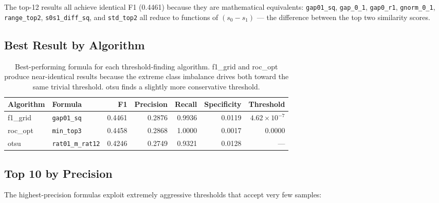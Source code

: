 \documentclass[11pt,a4paper]{article}
\newcommand{\formula}[1]{\texttt{#1}}
\newcommand{\algo}[1]{\textsf{#1}}
\begin{document}
\noindent The top-12 results all achieve identical F1 (0.4461) because they are mathematical equivalents: \formula{gap01\_sq}, \formula{gap\_0\_1}, \formula{gap0\_r1}, \formula{gnorm\_0\_1}, \formula{range\_top2}, \formula{s0s1\_diff\_sq}, and \formula{std\_top2} all reduce to functions of $(s_0 - s_1)$ --- the difference between the top two similarity scores.

\subsection{Best Result by Algorithm}

\begin{table}[htbp]
\centering
\caption{Best-performing formula for each threshold-finding algorithm. \algo{f1\_grid} and \algo{roc\_opt} produce near-identical results because the extreme class imbalance drives both toward the same trivial threshold. \algo{otsu} finds a slightly more conservative threshold.}
\label{tab:best_by_algo}
\begin{tabular}{@{}llrrrrr@{}}
\toprule
\textbf{Algorithm} & \textbf{Formula} & \textbf{F1} & \textbf{Precision} & \textbf{Recall} & \textbf{Specificity} & \textbf{Threshold} \\
\midrule
f1\_grid & \formula{gap01\_sq} & 0.4461 & 0.2876 & 0.9936 & 0.0119 & $4.62 \times 10^{-7}$ \\
roc\_opt & \formula{min\_top3} & 0.4458 & 0.2868 & 1.0000 & 0.0017 & 0.0000 \\
otsu & \formula{rat01\_m\_rat12} & 0.4246 & 0.2749 & 0.9321 & 0.0128 & --- \\
\bottomrule
\end{tabular}
\end{table}

\subsection{Top 10 by Precision}

The highest-precision formulas exploit extremely aggressive thresholds that accept very few samples:
\end{document}
